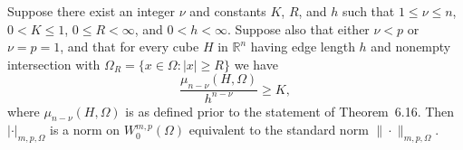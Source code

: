 \begin{theorem}
  Suppose there exist an integer $\nu$ and constants $K$, $R$, and $h$ such that
  $1\leq\nu\leq n$, $0<K\leq 1$, $0\leq R<\infty$, and $0<h<\infty$.
  Suppose also that either $\nu<p$ or $\nu=p=1$, and that for every cube $H$
  in $\mathbb{R}^n$ having edge length $h$ and nonempty intersection with
  $\Omega_R = \{x\in\Omega : |x|\geq R\}$ we have
  \[ \frac{\mu_{n-\nu}(H,\Omega)}{h^{n-\nu}} \geq K, \]
  where $\mu_{n-\nu}(H,\Omega)$ is as defined prior to the statement of Theorem~6.16.
  Then $|\cdot|_{m,p,\Omega}$ is a norm on $W_0^{m,p}(\Omega)$
  equivalent to the standard norm $\|\cdot\|_{m,p,\Omega}$.
\end{theorem}